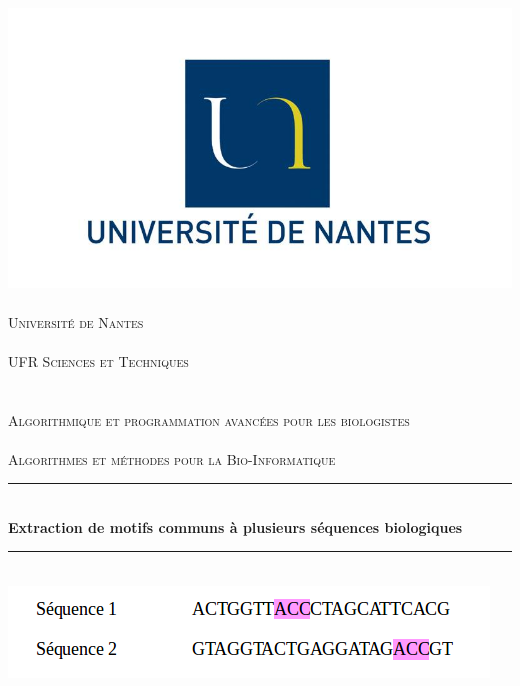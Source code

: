 \setlength{\parindent}{0cm}
\setlength{\parskip}{1ex plus 0.5ex minus 0.2ex}
\newcommand{\hsp}{\hspace{20pt}}
\newcommand{\HRule}{\rule{\linewidth}{0.5mm}}
\begin{titlepage}
  \begin{sffamily}
  \begin{center}

    \includegraphics[scale=0.2]{logo.jpg}~\\[2cm]

    \textsc{\LARGE Université de Nantes}\\
    \textsc{\LARGE  }\\
    \textsc{\Large UFR Sciences et Techniques}\\
    \textsc{\LARGE  }\\
    \textsc{\LARGE  }\\
    \textsc{\Large Algorithmique et programmation avancées pour les biologistes}\\
    \textsc{\LARGE  }\\
    \textsc{\Large Algorithmes et méthodes pour la Bio-Informatique}\\[1cm]

    \HRule \\[0.4cm]
    { \huge \bfseries Extraction de motifs communs à plusieurs séquences biologiques\\[0.4cm]
     }
    \HRule \\[2cm]

     \includegraphics[scale=0.7]{deco.png}~\\[2cm]
    

\end{center}
\end{sffamily}
\end{titlepage}
